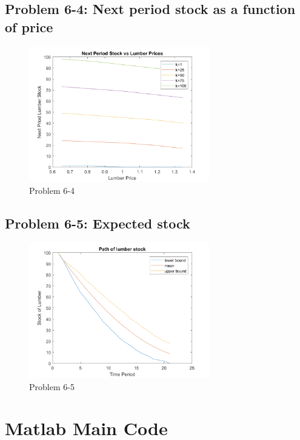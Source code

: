 \documentclass[11pt,letter]{article}
\newcounter{lem}[section] \setcounter{lem}{0}
\begin{document}
\newpage
\subsection*{Problem 6-4: Next period stock as a function of price}
\begin{figure}[h]
\begin{center}
\caption{Problem 6-4}
\includegraphics[width=0.7\textwidth]{prob6_2.png}
\end{center}
\end{figure}

\newpage
\subsection*{Problem 6-5: Expected stock}
\begin{figure}[h]
\begin{center}
\caption{Problem 6-5}
\includegraphics[width=0.7\textwidth]{prob6_3_2.png}
\end{center}
\end{figure}

\newpage
\section*{Matlab Main Code}

\end{document}
